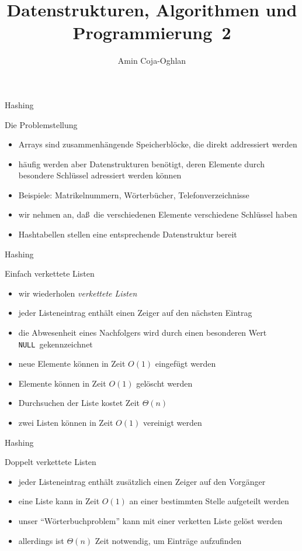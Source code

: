 \documentclass[aspectratio=1610, 11pt]{beamer}
\title{Datenstrukturen, Algorithmen und Programmierung~2}
\author[A.~Coja-Oghlan]{Amin Coja-Oghlan}
\institute[DAP2]{Lehrstuhl Informatik 2\\Fakult\"at f\"ur Informatik}
\newcommand\NULL{{\tt NULL}}
\begin{document}
\maketitle

\begin{frame}{Hashing}
	\begin{exampleblock}{Die Problemstellung}
		\begin{itemize}
			\item Arrays sind zusammenh\"angende Speicherbl\"ocke, die direkt addressiert werden
			\item h\"aufig werden aber Datenstrukturen ben\"otigt, deren Elemente durch besondere Schl\"ussel adressiert werden k\"onnen
			\item \alert{Beispiele:} Matrikelnummern, W\"orterb\"ucher, Telefonverzeichnisse 
			\item wir nehmen an, da\ss\ die verschiedenen Elemente verschiedene Schl\"ussel haben
			\item Hashtabellen stellen eine entsprechende Datenstruktur bereit 
		\end{itemize}
	\end{exampleblock}
\end{frame}

\begin{frame}{Hashing}
	\begin{exampleblock}{Einfach verkettete Listen}
		\begin{itemize}
			\item wir wiederholen {\em verkettete Listen}
			\item jeder Listeneintrag enth\"alt einen \alert{Zeiger} auf den n\"achsten Eintrag 
			\item die Abwesenheit eines Nachfolgers wird durch einen besonderen Wert \NULL\ gekennzeichnet
			\item neue Elemente k\"onnen in Zeit $O(1)$ eingef\"ugt werden
			\item Elemente k\"onnen in Zeit $O(1)$ gel\"oscht werden
			\item Durchsuchen der Liste kostet Zeit $\Theta(n)$
			\item zwei Listen k\"onnen in Zeit $O(1)$ vereinigt werden
		\end{itemize}
	\end{exampleblock}
\end{frame}

\begin{frame}{Hashing}
	\begin{exampleblock}{Doppelt verkettete Listen}
		\begin{itemize}
			\item jeder Listeneintrag enth\"alt zus\"atzlich einen Zeiger auf den Vorg\"anger
			\item eine Liste kann in Zeit $O(1)$ an einer bestimmten Stelle aufgeteilt werden
			\item unser ``W\"orterbuchproblem'' kann mit einer verketten Liste gel\"ost werden
			\item allerdings ist $\Theta(n)$ Zeit notwendig, um Eintr\"age aufzufinden
		\end{itemize}
	\end{exampleblock}
\end{frame}
\end{document}
